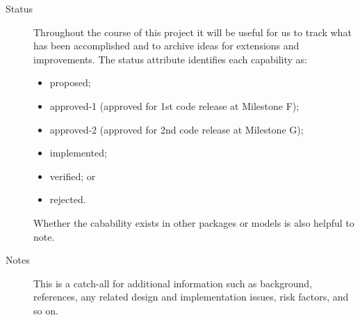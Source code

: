 \begin{description}
\item [Status] Throughout the course of this project it will be 
useful for us to track what has been accomplished and to archive 
ideas for extensions and improvements.  The status attribute identifies
each capability as:
\begin{itemize}
\item proposed;
\item approved-1 (approved for 1st code release at Milestone F);
\item approved-2 (approved for 2nd code release at Milestone G);
\item implemented; 
\item verified; or
\item rejected.  
\end{itemize}
Whether the cabability exists in other packages or models
is also helpful to note.

\item [Notes] This is a catch-all for additional information such
as background, references, any related design and implementation issues, 
risk factors, and so on.

\end{description}

